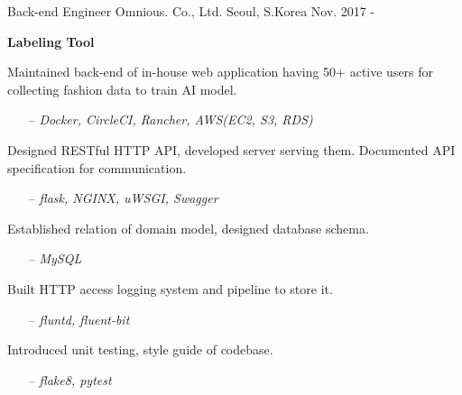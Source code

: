 

\begin{cventries}

  \cventry
    {Back-end Engineer} %
    {Omnious. Co., Ltd.} %
    {Seoul, S.Korea} %
    {Nov. 2017 - } %
    {
      \begin{cvitems} %
        \item[] {\textbf{Labeling Tool}}
        \item {Maintained back-end of in-house web application having 50+ active users for collecting fashion data to train AI model.}
        \begin{itemize}
          \item[--] \textit{Docker, CircleCI, Rancher, AWS(EC2, S3, RDS)}
        \end{itemize}
        \item {Designed RESTful HTTP API, developed server serving them. Documented API specification for communication.}
        \begin{itemize}
          \item[--] \textit{flask, NGINX, uWSGI, Swagger}
        \end{itemize}
        \item {Established relation of domain model, designed database schema.}
        \begin{itemize}
          \item[--] \textit{MySQL}
        \end{itemize}
        \item {Built HTTP access logging system and pipeline to store it.}
        \begin{itemize}
          \item[--] \textit{fluntd, fluent-bit}
        \end{itemize}
        \item {Introduced unit testing, style guide of codebase.}
        \begin{itemize}
          \item[--] \textit{flake8, pytest}

\end{itemize}
\end{cvitems}}
\end{cventries}

